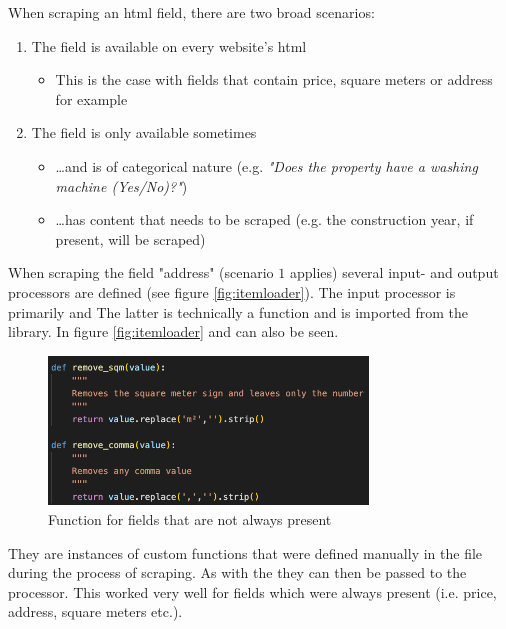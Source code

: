 \documentclass[main]{subfiles}
\begin{document}
When scraping an \acs*{html} field, there are two broad scenarios:
\begin{enumerate}
    \item The field is available on every website's \acs*{html}
    \begin{itemize}
        \item This is the case with fields that contain price, square meters or address for example
    \end{itemize}
    \item The field is only available sometimes
    \begin{itemize}
        \item …and is of categorical nature (e.g. \textit{"Does the property have a washing machine (Yes/No)?"})
        \item …has content that needs to be scraped (e.g. the construction year, if present, will be scraped)
    \end{itemize}
\end{enumerate}

When scraping the field "address" (scenario $1$ applies) several input- and output processors are defined (see figure \ref{fig:itemloader}).
The input processor is primarily \pkg[MapCompose()] and 
The latter is technically a function and is imported from the  library.
In figure \ref{fig:itemloader}  and   can also be seen.

\begin{figure}[htbp]
    \centerline{
        \includegraphics[width = 85mm]{prog_18.png}}
    \caption{Function for fields that are not always present}
    \label{fig:remove_string}
\end{figure}

They are instances of custom functions that were defined manually 
in the \pkg[items.py] file during the process of scraping.
As with the  they can then be passed to the \pkg[MapCompose()] processor.
This worked very well for fields which were always present (i.e. price, address, square meters etc.).
\end{document}

